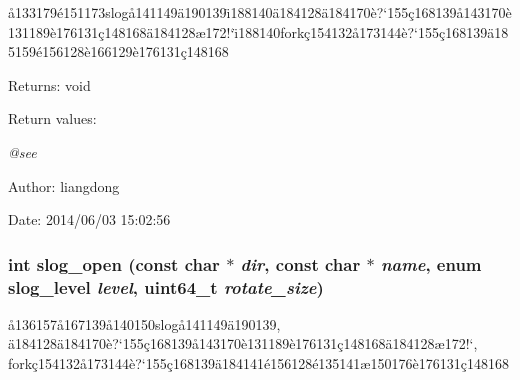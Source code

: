 \aa{}133179\'{e}151173slog\aa{}141149\"{a}190139\"{\i}188140\"{a}184128\"{a}184170\`{e}?`155\c{c}168139\aa{}143170\`{e}131189\`{e}176131\c{c}148168\"{a}184128\ae{}172!`\"{\i}188140fork\c{c}154132\aa{}173144\`{e}?`155\c{c}168139\"{a}185159\'{e}156128\`{e}166129\`{e}176131\c{c}148168 

\begin{Desc}
\item[Returns:]void \end{Desc}
\begin{Desc}
\item[Return values:]
\begin{description}
\item[{\em @see}]\end{description}
\end{Desc}
\begin{Desc}
\item[Author:]liangdong \end{Desc}
\begin{Desc}
\item[Date:]2014/06/03 15:02:56 \end{Desc}
\subsubsection{\setlength{\rightskip}{0pt plus 5cm}int slog\_\-open (const char $\ast$ {\em dir}, const char $\ast$ {\em name}, enum slog\_\-level {\em level}, uint64\_\-t {\em rotate\_\-size})}\label{slog_8h_a8}


\aa{}136157\aa{}167139\aa{}140150slog\aa{}141149\"{a}190139, \"{a}184128\"{a}184170\`{e}?`155\c{c}168139\aa{}143170\`{e}131189\`{e}176131\c{c}148168\"{a}184128\ae{}172!`, fork\c{c}154132\aa{}173144\`{e}?`155\c{c}168139\"{a}184141\'{e}156128\'{e}135141\ae{}150176\`{e}176131\c{c}148168 

